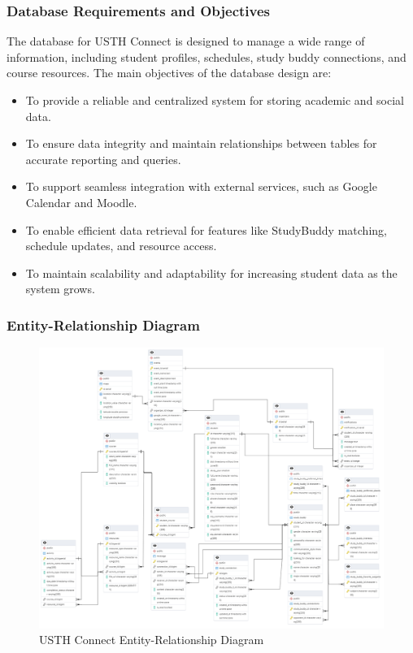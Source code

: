 \documentclass[12pt]{article}
\begin{document}
\subsubsection{Database Requirements and Objectives}  
The database for USTH Connect is designed to manage a wide range of information, including student profiles, schedules, study buddy connections, and course resources. The main objectives of the database design are:  
\begin{itemize}  
    \item To provide a reliable and centralized system for storing academic and social data.  
    \item To ensure data integrity and maintain relationships between tables for accurate reporting and queries.  
    \item To support seamless integration with external services, such as Google Calendar and Moodle.  
    \item To enable efficient data retrieval for features like StudyBuddy matching, schedule updates, and resource access.  
    \item To maintain scalability and adaptability for increasing student data as the system grows.  
\end{itemize} 

\subsubsection{Entity-Relationship Diagram}
\begin{figure}[H]
    \centering
    \includegraphics[width=1\textwidth]{image/USTH-Connect-Database-Schema-Light.pdf} 
    \caption{USTH Connect Entity-Relationship Diagram}
\end{figure}
\end{document}
